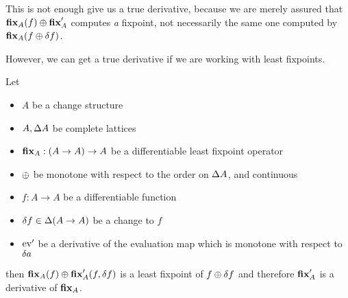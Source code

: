 This is not enough give us a true derivative, because we are merely
assured that $\textbf{fix}_A(f) \oplus \textbf{fix}_A'$ computes \emph{a} fixpoint, not necessarily
the same one computed by $\textbf{fix}_A{(f \oplus \delta f)}$.

However, we can get a true derivative if we are working with least fixpoints.

\begin{thm}
\label{thm:leastFixpointDiff}
  Let 
  \begin{itemize}
    \item $A$ be a change structure 
    \item $A, \Delta A$ be complete lattices
    \item$\textbf{fix}_A : (A \rightarrow A) \rightarrow A$ be a differentiable
      least fixpoint operator
    \item $\oplus$ be monotone with respect to the order on $\Delta A$, and continuous
    \item $f: A \rightarrow A$ be a differentiable function
    \item $\delta f \in \Delta (A \rightarrow A)$ be a change to $f$
    \item $\operatorname{ev}'$ be a derivative of the evaluation map which is monotone
      with respect to $\delta a$
  \end{itemize}

  then $\textbf{fix}_A(f) \oplus \textbf{fix}_A'(f, \delta f)$ is a least
  fixpoint of $f \oplus \delta f$ and therefore $\textbf{fix}_A'$ is a derivative of $\textbf{fix}_A$.
\end{thm}
